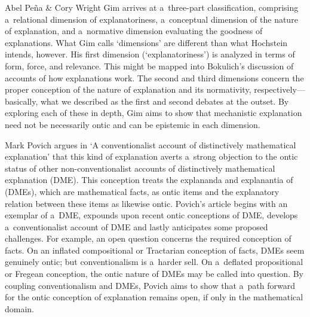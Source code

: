 \begin{editorialeng}{Abel Peña \& Cory Wright}
Gim arrives at a~three-part classification, comprising a~relational dimension of explanatoriness, a~conceptual dimension of the nature of explanation, and a~normative dimension evaluating the goodness of explanations. What Gim calls `dimensions' are different than what Hochstein intends, however. His first dimension (`explanatoriness') is analyzed in terms of form, force, and relevance. This might be mapped into Bokulich's discussion of accounts of how explanations work. The second and third dimensions concern the proper conception of the nature of explanation and its normativity, respectively---basically, what we described as the first and second debates at the outset. By exploring each of these in depth, Gim aims to show that mechanistic explanation need not be necessarily ontic and can be epistemic in each dimension.

Mark Povich argues in `A conventionalist account of distinctively mathematical explanation' that this kind of explanation averts a~strong objection to the ontic status of other non-conventionalist accounts of distinctively mathematical explanation (DME). This conception treats the explananda and explanantia of (DMEs), which are mathematical facts, as ontic items and the explanatory relation between these items as likewise ontic. Povich's article begins with an exemplar of a~DME, expounds upon recent ontic conceptions of DME, develops a~conventionalist account of DME and lastly anticipates some proposed challenges. For example, an open question concerns the required conception of facts. On an inflated compositional or Tractarian conception of facts, DMEs seem genuinely ontic; but conventionalism is a~harder sell. On a~deflated propositional or Fregean conception, the ontic nature of DMEs may be called into question. By coupling conventionalism and DMEs, Povich aims to show that a~path forward for the ontic conception of explanation remains open, if only in the mathematical domain.


\end{editorialeng}
